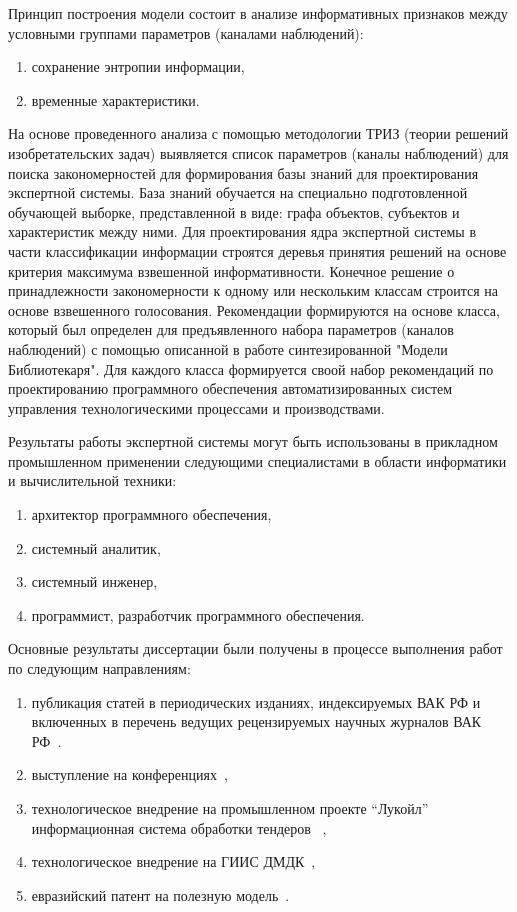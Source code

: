 Принцип построения модели состоит в  анализе информативных признаков между условными группами параметров (каналами наблюдений):
\begin{enumerate}
    \item сохранение энтропии информации,
    \item временные характеристики.
\end{enumerate} 

На основе проведенного анализа с помощью методологии ТРИЗ (теории решений изобретательских задач) выявляется список параметров (каналы наблюдений) для поиска закономерностей для формирования базы знаний для проектирования экспертной системы. База знаний обучается на специально подготовленной обучающей выборке, представленной в виде: графа объектов, субъектов и характеристик между ними.  Для проектирования ядра экспертной системы в части классификации информации строятся деревья принятия решений на основе критерия максимума взвешенной информативности. Конечное решение о принадлежности закономерности к одному или нескольким классам строится на основе взвешенного голосования. Рекомендации формируются на основе класса, который был определен для предъявленного набора параметров (каналов наблюдений) с помощью описанной в работе синтезированной "Модели Библиотекаря". Для каждого класса формируется своой набор рекомендаций по проектированию программного обеспечения  автоматизированных систем управления технологическими процессами и производствами. 

Результаты работы экспертной системы могут быть использованы в прикладном промышленном применении следующими специалистами в области информатики и вычислительной техники:
\begin{enumerate}
    \item архитектор программного обеспечения,
    \item системный аналитик,
    \item системный инженер,
    \item программист, разработчик программного обеспечения.
\end{enumerate}

Основные результаты диссертации были получены в процессе выполнения работ по следующим направлениям:
\begin{enumerate}
    \item публикация статей в периодических изданиях, индексируемых ВАК РФ и включенных в перечень ведущих рецензируемых научных журналов ВАК РФ~\cite{VAK1, VAK2}.
    \item выступление на конференциях~\cite{weconf},
    \item технологическое внедрение на промышленном проекте “Лукойл” информационная система обработки тендеров ~\cite{app:B4},
    \item технологическое внедрение на ГИИС ДМДК~\cite{app:B4},
    \item евразийский патент на полезную модель~\cite{}.
\end{enumerate}

